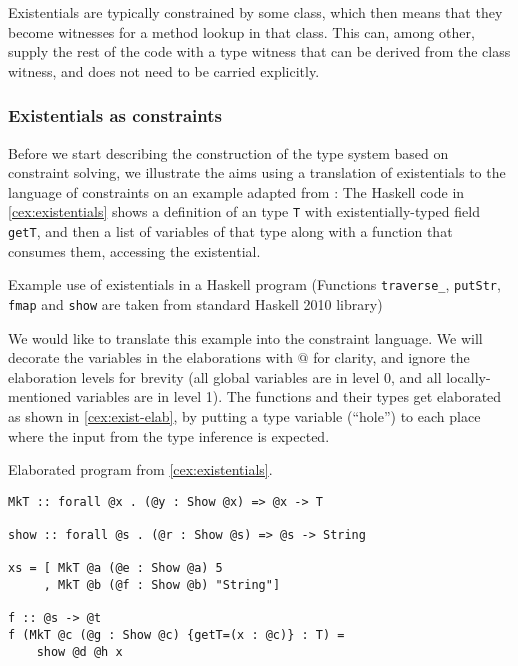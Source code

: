 Existentials are typically constrained by some class, which then means that they become witnesses for a method lookup in that class. This can, among other, supply the rest of the code with a type witness that can be derived from the class witness, and does not need to be carried explicitly.

\subsubsection{Existentials as constraints}

Before we start describing the construction of the type system based on constraint solving, we illustrate the aims using a translation of existentials to the language of constraints on an example adapted from \citet{peytonjones2019type}:
The Haskell code in \cref{cex:existentials} shows a definition of an type \lstinline{T} with existentially-typed field \lstinline{getT}, and then a list of variables of that type along with a function that consumes them, accessing the existential.

\begin{codex}

\caption{Example use of existentials in a Haskell program (Functions \texttt{traverse\_}, \texttt{putStr}, \texttt{fmap} and \texttt{show} are taken from standard Haskell 2010 library)}
\label{cex:existentials}
\end{codex}

We would like to translate this example into the constraint language. We will decorate the variables in the elaborations with $@$ for clarity, and ignore the elaboration levels for brevity (all global variables are in level 0, and all locally-mentioned variables are in level 1). The functions and their types get elaborated as shown in \cref{cex:exist-elab}, by putting a type variable (``hole'') to each place where the input from the type inference is expected.

\begin{codex}
\caption{Elaborated program from \cref{cex:existentials}.}
\label{cex:exist-elab}
\begin{lstlisting}[style=haskellStyle]
MkT :: forall @x . (@y : Show @x) => @x -> T

show :: forall @s . (@r : Show @s) => @s -> String

xs = [ MkT @a (@e : Show @a) 5
     , MkT @b (@f : Show @b) "String"]

f :: @s -> @t
f (MkT @c (@g : Show @c) {getT=(x : @c)} : T) =
    show @d @h x
\end{lstlisting}
\end{codex}

